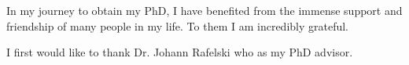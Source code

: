
In my journey to obtain my PhD, I have benefited from the immense support and friendship of many people in my life. To them I am incredibly grateful.

I first would like to thank Dr. Johann Rafelski who as my PhD advisor.